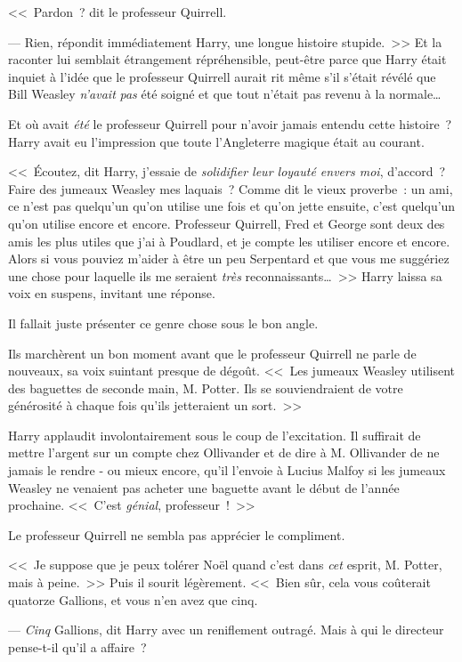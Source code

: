 <<~Pardon~? dit le professeur Quirrell.

--- Rien, répondit immédiatement Harry, une longue histoire stupide.~>> Et la raconter lui semblait étrangement répréhensible, peut-être parce que Harry était inquiet à l'idée que le professeur Quirrell aurait rit même s'il s'était révélé que Bill Weasley \emph{n'avait} \emph{pas} été soigné et que tout n'était pas revenu à la normale…

Et où avait \emph{été} le professeur Quirrell pour n'avoir jamais entendu cette histoire~? Harry avait eu l'impression que toute l'Angleterre magique était au courant.

<<~Écoutez, dit Harry, j'essaie de \emph{solidifier leur loyauté envers moi}, d'accord~? Faire des jumeaux Weasley mes laquais~? Comme dit le vieux proverbe~: un ami, ce n'est pas quelqu'un qu'on utilise une fois et qu'on jette ensuite, c'est quelqu'un qu'on utilise encore et encore. Professeur Quirrell, Fred et George sont deux des amis les plus utiles que j'ai à Poudlard, et je compte les utiliser encore et encore. Alors si vous pouviez m'aider à être un peu Serpentard et que vous me suggériez une chose pour laquelle ils me seraient \emph{très} reconnaissants…~>> Harry laissa sa voix en suspens, invitant une réponse.

Il fallait juste présenter ce genre chose sous le bon angle.

Ils marchèrent un bon moment avant que le professeur Quirrell ne parle de nouveaux, sa voix suintant presque de dégoût. <<~Les jumeaux Weasley utilisent des baguettes de seconde main, M. Potter. Ils se souviendraient de votre générosité à chaque fois qu'ils jetteraient un sort.~>>

Harry applaudit involontairement sous le coup de l'excitation. Il suffirait de mettre l'argent sur un compte chez Ollivander et de dire à M. Ollivander de ne jamais le rendre - ou mieux encore, qu'il l'envoie à Lucius Malfoy si les jumeaux Weasley ne venaient pas acheter une baguette avant le début de l'année prochaine. <<~C'est \emph{génial}, professeur~!~>>

Le professeur Quirrell ne sembla pas apprécier le compliment.

<<~Je suppose que je peux tolérer Noël quand c'est dans \emph{cet} esprit, M. Potter, mais à peine.~>> Puis il sourit légèrement. <<~Bien sûr, cela vous coûterait quatorze Gallions, et vous n'en avez que cinq.

--- \emph{Cinq} Gallions, dit Harry avec un reniflement outragé. Mais à qui le directeur pense-t-il qu'il a affaire~?

